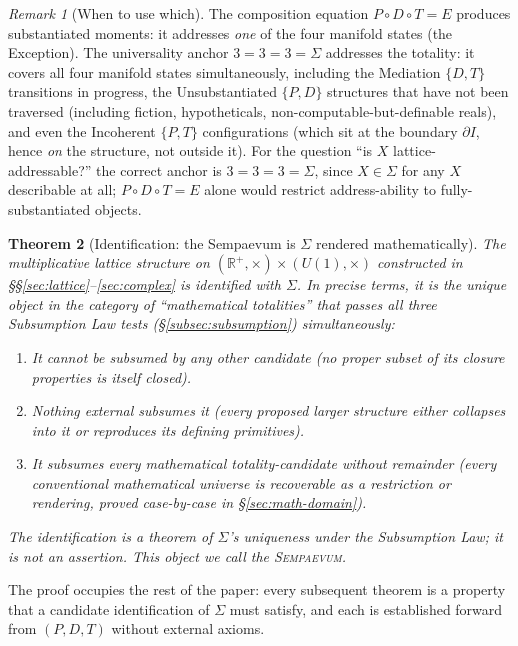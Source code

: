 \documentclass[11pt,a4paper]{article}
\newtheorem{theorem}{Theorem}[section]
\theoremstyle{definition}
\theoremstyle{remark}
\newtheorem{remark}[theorem]{Remark}
\newcommand{\R}{\mathbb{R}}
\newcommand{\Sempaevum}{\textsc{Sempaevum}}
\begin{document}
\begin{remark}[When to use which]
The composition equation $P\circ D\circ T=E$ produces substantiated moments: it addresses \emph{one} of the four manifold states (the Exception). The universality anchor $3=3=3=\Sigma$ addresses the totality: it covers all four manifold states simultaneously, including the Mediation $\{D,T\}$ transitions in progress, the Unsubstantiated $\{P,D\}$ structures that have not been traversed (including fiction, hypotheticals, non-computable-but-definable reals), and even the Incoherent $\{P,T\}$ configurations (which sit at the boundary $\partial I$, hence \emph{on} the structure, not outside it). For the question ``is $X$ lattice-addressable?'' the correct anchor is $3=3=3=\Sigma$, since $X\in\Sigma$ for any $X$ describable at all; $P\circ D\circ T=E$ alone would restrict address-ability to fully-substantiated objects.
\end{remark}

\begin{theorem}[Identification: the Sempaevum is $\Sigma$ rendered mathematically]\label{thm:identification-Sigma}
The multiplicative lattice structure on $(\R^{+},\times)\times (U(1),\times)$ constructed in \S\S\ref{sec:lattice}--\ref{sec:complex} is identified with $\Sigma$. In precise terms, it is the unique object in the category of ``mathematical totalities'' that passes all three Subsumption Law tests (\S\ref{subsec:subsumption}) simultaneously:
\begin{enumerate}[label=(\roman*),leftmargin=*]
\item It cannot be subsumed by any other candidate (no proper subset of its closure properties is itself closed).
\item Nothing external subsumes it (every proposed larger structure either collapses into it or reproduces its defining primitives).
\item It subsumes every mathematical totality-candidate without remainder (every conventional mathematical universe is recoverable as a restriction or rendering, proved case-by-case in \S\ref{sec:math-domain}).
\end{enumerate}
The identification is a theorem of $\Sigma$'s uniqueness under the Subsumption Law; it is \emph{not} an assertion. This object we call the \Sempaevum.
\end{theorem}

The proof occupies the rest of the paper: every subsequent theorem is a property that a candidate identification of $\Sigma$ must satisfy, and each is established forward from $(P,D,T)$ without external axioms.
\end{document}
